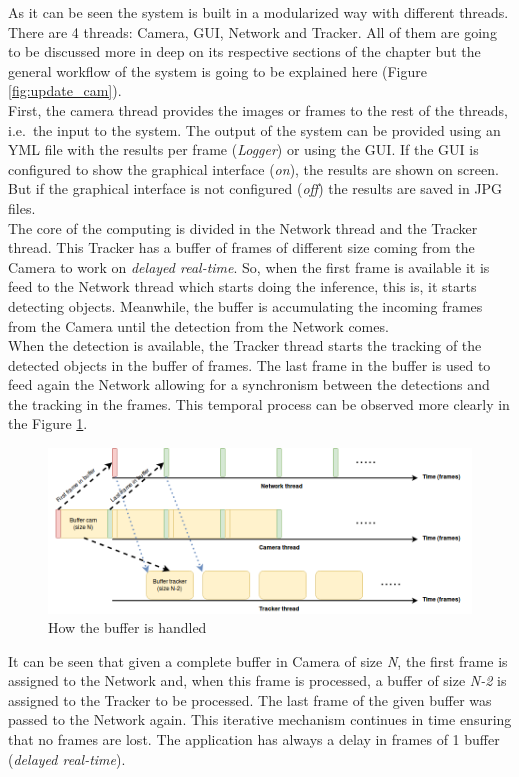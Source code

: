 As it can be seen the system is built in a modularized way with different threads. There are 4 threads: Camera, GUI, Network and Tracker. All of them are going to be discussed more in deep on its respective sections of the chapter but the general workflow of the system is going to be explained here (Figure \ref{fig:update_cam}).\\
First, the camera thread provides the images or frames to the rest of the threads, i.e.\ the input to the system. The output of the system can be provided using an YML file with the results per frame (\textit{Logger}) or using the GUI. If the GUI is configured to show the graphical interface (\textit{on}), the results are shown on screen. But if the graphical interface is not configured (\textit{off}) the results are saved in JPG files.\\ The core of the computing is divided in the Network thread and the Tracker thread. This Tracker has a buffer of frames of different size coming from the Camera to work on \textit{delayed real-time}. So, when the first frame is available it is feed to the Network thread which starts doing the inference, this is, it starts detecting objects. Meanwhile, the buffer is accumulating the incoming frames from the Camera until the detection from the Network comes.\\
When the detection is available, the Tracker thread starts the tracking of the detected objects in the buffer of frames. The last frame in the buffer is used to feed again the Network allowing for a synchronism between the detections and the tracking in the frames. This temporal process can be observed more clearly in the Figure \ref{fig:buffer}.
\begin{figure}[H]
\begin{center}
\includegraphics[scale=0.4]{figures/buffer.png}
\caption{How the buffer is handled}
\label{fig:buffer}
\end{center}
\end{figure}
It can be seen that given a complete buffer in Camera of size \textit{N}, the first frame is assigned to the Network and, when this frame is processed, a buffer of size \textit{N-2} is assigned to the Tracker to be processed. The last frame of the given buffer was passed to the Network again. This iterative mechanism continues in time ensuring that no frames are lost. The application has always a delay in frames of 1 buffer (\textit{delayed real-time}).
